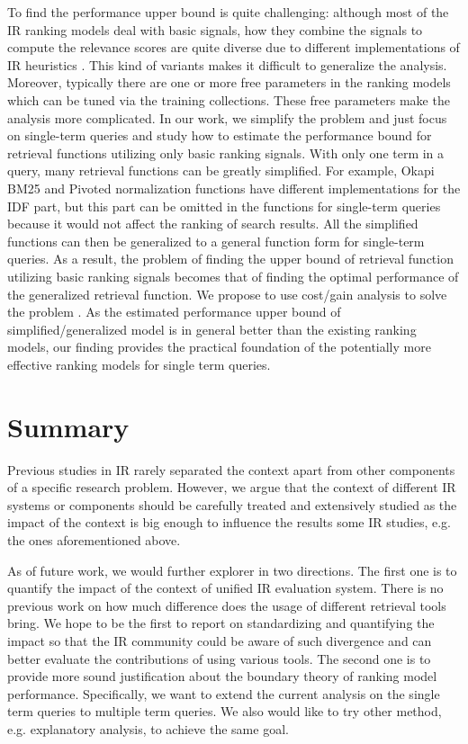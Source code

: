 To find the performance upper bound is quite challenging: although most of 
the IR ranking models deal with basic signals, how they combine the signals 
to compute the relevance scores are quite diverse due to different 
implementations of IR heuristics \cite{Fang:2004:FSI:1008992.1009004}. 
This kind of variants makes it difficult to generalize the analysis. 
Moreover, typically there are one or more free parameters in the ranking 
models which can be tuned via the training collections. 
These free parameters make the analysis more complicated.
In our work, we simplify the problem and just focus on single-term queries 
and study how to estimate the performance bound for retrieval functions 
utilizing only basic ranking signals. 
With only one term in a query, many retrieval functions can be greatly 
simplified. For example, Okapi BM25 and Pivoted normalization functions have 
different implementations for the IDF part, but this part can be omitted in the 
functions for single-term queries because it would not affect the ranking of 
search results. All the simplified functions can then be generalized to a 
general function form for single-term queries. As a result, the problem of 
finding the upper bound of retrieval function utilizing basic ranking signals 
becomes that of finding the optimal performance of the generalized retrieval 
function. We propose to use cost/gain analysis to solve the problem 
\cite{export:132652,export:68133,export:81144}. 
As the estimated performance upper bound of simplified/generalized model is 
in general better than the existing ranking models, our finding provides the 
practical foundation of the potentially more effective ranking models for 
single term queries.

\section{Summary}

Previous studies in IR rarely separated the context apart from other 
components of a specific research problem. However, we argue that the 
context of different IR systems or components should be carefully treated 
and extensively studied as the impact of the context is big enough to 
influence the results some IR studies, e.g. the ones aforementioned above.

As of future work, we would further explorer in two directions. 
The first one is to quantify the impact of the context of unified 
IR evaluation system. There is no previous work on how much difference does 
the usage of different retrieval tools bring.
We hope to be the first to report on standardizing and quantifying the 
impact so that the IR community could be aware of such divergence and can 
better evaluate the contributions of using various tools. 
The second one is to provide more sound justification about the boundary 
theory of ranking model performance. Specifically, we want to extend the 
current analysis on the single term queries to multiple term queries. 
We also would like to try other method, e.g. explanatory analysis, 
to achieve the same goal.

